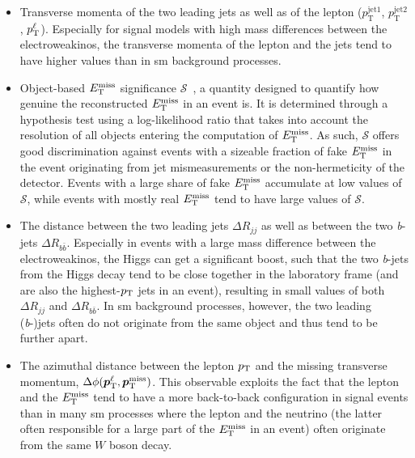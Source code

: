 \begin{itemize}
	\item Transverse momenta of the two leading jets as well as of the lepton ($p_\textrm{T}^\mathrm{jet1}$, $p_\textrm{T}^\mathrm{jet2}$, $p^\ell_{\textrm{T}}$). Especially for signal models with high mass differences between the electroweakinos, the transverse momenta of the lepton and the jets tend to have higher values than in \gls{sm} background processes.
	\item Object-based $E_{\textrm{T}}^{\textrm{miss}}$ significance $\mathcal{S}$~\cite{met_significance:2294922}, a quantity designed to quantify how genuine the reconstructed $E_{\textrm{T}}^{\textrm{miss}}$ in an event is. It is determined through a hypothesis test using a log-likelihood ratio that takes into account the resolution of all objects entering the computation of $E_{\textrm{T}}^{\textrm{miss}}$. As such, $\mathcal{S}$ offers good discrimination against events with a sizeable fraction of fake $E_{\textrm{T}}^{\textrm{miss}}$ in the event originating \eg from jet mismeasurements or the non-hermeticity of the detector. Events with a large share of fake $E_{\textrm{T}}^{\textrm{miss}}$ accumulate at low values of $\mathcal{S}$, while events with mostly real $E_{\textrm{T}}^{\textrm{miss}}$ tend to have large values of $\mathcal{S}$. 
	\item The distance between the two leading jets $\Delta R_{jj}$ as well as between the two \textit{b}-jets $\Delta R_{b\bar{b}}$. Especially in events with a large mass difference between the electroweakinos, the Higgs can get a significant boost, such that the two \textit{b}-jets from the Higgs decay tend to be close together in the laboratory frame (and are also the highest-$p_{\mathrm{T}}$ jets in an event), resulting in small values of both $\Delta R_{jj}$ and $\Delta R_{b\bar{b}}$. In \gls{sm} background processes, however, the two leading (\textit{b}-)jets often do not originate from the same object and thus tend to be further apart.
	\item The azimuthal distance between the lepton $p_{\mathrm{T}}$ and the missing transverse momentum, $\Delta \phi (\makemebold{p}_\mathrm{T}^\ell, \makemebold{p}_\mathrm{T}^\mathrm{miss})$. This observable exploits the fact that the lepton and the $E_{\textrm{T}}^{\textrm{miss}}$ tend to have a more back-to-back configuration in signal events than in many \gls{sm} processes where the lepton and the neutrino (the latter often responsible for a large part of the $E_{\textrm{T}}^{\textrm{miss}}$ in an event) often originate from the same $W$ boson decay.
\end{itemize}

